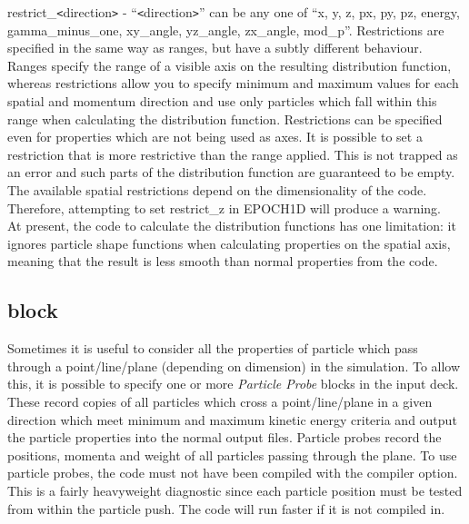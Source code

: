 {\emphtext restrict\_\verb|<|direction\verb|>|} - ``\verb|<|direction\verb|>|''
  can be any one of ``x, y, z, px, py, pz, energy, gamma\_minus\_one, xy\_angle,
  yz\_angle, zx\_angle, mod\_p''. Restrictions are specified in
  the same way as ranges, but have a subtly different behaviour. Ranges specify
  the range of a visible axis on the resulting distribution function, whereas
  restrictions allow you to specify minimum and maximum values for each
  spatial and momentum direction and use only particles which fall within this
  range when calculating the distribution function. Restrictions can be
  specified even
  for properties which are not being used as axes. It is possible to set a
  restriction that is more restrictive than the range applied. This is not
  trapped as an error and such parts of the distribution function are
  guaranteed to be empty. The available spatial restrictions depend on the
  dimensionality of the code. Therefore,
  attempting to set restrict\_z in EPOCH1D will produce a warning.\\

At present, the code to calculate the distribution functions has one
limitation: it ignores particle shape functions when calculating properties
on the spatial axis, meaning that the result is less smooth than normal
properties from the code.


\subsection{\texorpdfstring
  { block}
  {           {probe} block}}
\label{sec:probe_block}
Sometimes it is useful to consider all the properties of particle which pass
through a point/line/plane (depending on dimension) in the simulation. To
allow this, it is possible to specify one or more {\it Particle Probe} blocks
in the input deck. These record copies of all particles which cross a
point/line/plane in a given direction which meet minimum and maximum kinetic
energy criteria and output the particle properties into the normal output
files. Particle probes record the positions, momenta and weight of all
particles passing through the plane. To use particle probes, the code must
not have been
compiled with the  compiler option. This is
a fairly heavyweight diagnostic since each particle position must be tested
from within the particle push. The code will run faster if it is not compiled
in.\\


